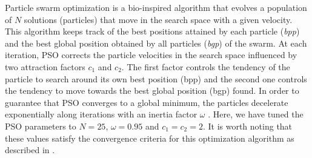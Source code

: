 Particle swarm optimization is a bio-inspired algorithm that evolves a population of $N$ solutions (particles) that move in the search space with a given velocity. This algorithm keeps track of the best positions attained by each particle (\emph{bpp}) and the best global position obtained by all particles (\emph{bgp}) of the swarm.  At each iteration, PSO corrects the particle velocities in the search space influenced by two attraction factors $c_1$ and $c_2$. The first factor  controls the tendency of the particle to search around its own best position (bpp) and the second one controls the tendency to move towards the best global position (bgp) found.  In order to guarantee that PSO converges to a global minimum, the particles decelerate exponentially along iterations with an inertia factor $\omega$ \cite{Yuhui:1998}. Here,  we have tuned the PSO parameters to $N = 25$, $\omega = 0.95$ and $c_1 = c_2 = 2$. It is worth noting that these values satisfy the convergence criteria for this optimization algorithm as described in \cite{Jiang20078}.
\begin{comment}
\begin{algorithm}[ht]
\caption{Particle Swarm Optimization}
\label{alg:pso}
\begin{algorithmic}
\Require $N\text{,}\:M > 0$,  $\:\omega \in (0,1]$, $\:c_1\text{,}\:c_2 \in R^+ $, $\:COST$
\Ensure The best found solution that minimizes $COST$
\For{$i = 0,\:1,\:\cdots,\:N-1$}
\For{$j = 0,\:1,\:\cdots,\:M-1$}
\State $pop[i][j] \gets U(0.125,125.5)$ 
\State $v[i][j] \gets U(0.125,125.5)$
\EndFor
\State $fit[i] \gets$ \Call{$COST$}{$\boldsymbol{pop}[i]$}
\State $\boldsymbol{bpp}[i] \gets \boldsymbol{pop}[i]$ 
\EndFor
\State $\boldsymbol{bgp} \gets \boldsymbol{bpp}[argmin(\boldsymbol{fit})]$
\For{$i = 0,\:1,\:\cdots,\:1250$}
\For{$j = 0,\:1,\:\cdots,\:N-1$}
\State $\boldsymbol{v}[j] \gets \omega.\boldsymbol{v}[j]$
\State $\boldsymbol{v}[j] \gets \boldsymbol{v}[j] + c1.U(0,1).(\boldsymbol{pop}[j] - \boldsymbol{bpp}[j])$
\State $\boldsymbol{v}[j] \gets \boldsymbol{v}[j] + c2.U(0,1).(\boldsymbol{pop}[j] - \boldsymbol{bgp})$
\State $\boldsymbol{pop}[j] \gets \boldsymbol{pop}[j] + \boldsymbol{v}[j]$
\For{$k = 0,\:1,\:\cdots,\:M-1$}
\If{$pop[j][k] \notin [0.125,125.0]$}
\State $pop[j][k] \gets U(0.125,125.0)$
\EndIf
\EndFor
\State $fit[j] \gets$ \Call{$COST$}{$\boldsymbol{pop}[j]$}
\If {$fit[j] <$ \Call{$COST$}{$\boldsymbol{bpp}[j]$}} 
\State $\boldsymbol{bpp}[j] \gets \boldsymbol{pop}[j]$
\EndIf
\If {\Call{$COST$}{$\boldsymbol{bpp}[j]$} $<$ \Call{$COST$}{$\boldsymbol{bgp}$}}
\State $\boldsymbol{bgp} \gets \boldsymbol{bpp}[j]$
\EndIf
\EndFor
\EndFor
\end{algorithmic}
\end{algorithm}
\end{comment}

